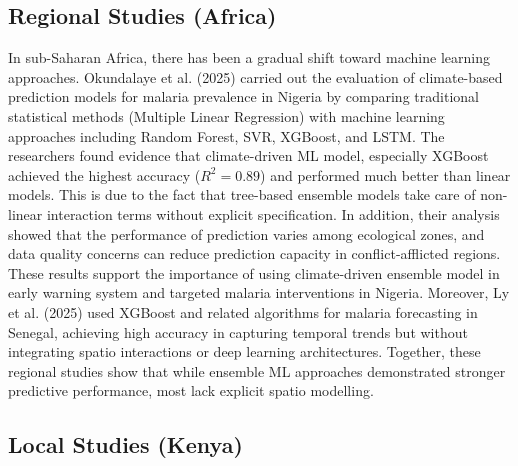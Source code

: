 \subsection{Regional Studies (Africa)}

In sub-Saharan Africa, there has been a gradual shift toward machine learning approaches. Okundalaye et al. (2025) \cite{Okundalaye2025Climate-based} carried out the evaluation of climate-based prediction models for malaria prevalence in Nigeria  by comparing traditional statistical methods (Multiple Linear Regression) with  machine learning approaches including Random Forest, SVR, XGBoost, and LSTM. The researchers found evidence that climate-driven ML model, especially XGBoost  achieved the highest accuracy ($R^2=0.89$) and performed much better than linear models. This is due to the fact that tree-based ensemble models take care of non-linear interaction terms without explicit specification. In addition, their analysis showed that the performance of prediction varies among ecological zones, and data quality concerns can reduce prediction capacity in conflict-afflicted regions.  These results support the importance of using climate-driven ensemble model in early warning system and targeted malaria interventions in Nigeria. Moreover, Ly et al. (2025) \cite{Ly2025Forecasting} used XGBoost and related algorithms for malaria forecasting in Senegal, achieving high accuracy in capturing temporal trends but without integrating spatio interactions or deep learning architectures. Together, these regional studies show that while ensemble ML approaches demonstrated stronger predictive performance, most lack explicit spatio modelling.

\subsection{Local Studies (Kenya)}

